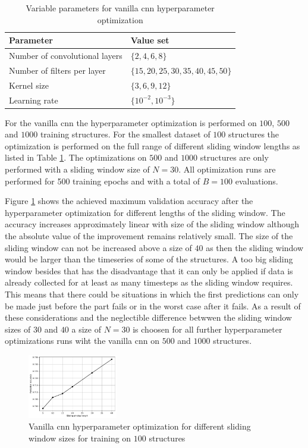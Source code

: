 \documentclass[conference]{IEEEtran}
\begin{document}
\begin{table}[htp]
	\centering
	\caption{Variable parameters for vanilla \gls{cnn} hyperparameter optimization}
	\label{tab:variable_parameters_cnn_optimization}
	\begin{tabular}{ll}
		\textbf{Parameter} & \textbf{Value set} \\
		\hline
		Number of convolutional layers & $ \{2, 4, 6, 8\} $ \\
		Number of filters per layer & $ \{15, 20, 25, 30, 35, 40, 45, 50\} $ \\
		Kernel size & $ \{3, 6, 9, 12\} $ \\
		Learning rate & $ \{10^{-2}, 10^{-3}\} $
	\end{tabular}
\end{table}

For the vanilla \gls{cnn} the hyperparameter optimization is performed on $ 100 $, $ 500 $ and $ 1000 $  training structures. For the smallest dataset of $ 100 $ structures the optimization is performed on the full range of different sliding window lengths as listed in Table \ref{tab:variable_parameters_cnn_optimization}. The optimizations on $ 500 $ and $ 1000 $ structures are only performed with a sliding window size of $ N = 30 $. All optimization runs are performed for 500 training epochs and with a total of $ B = 100 $ evaluations.

Figure \ref{fig:influence_sequence_length_cnn} shows the achieved maximum validation accuracy after the hyperparameter optimization for different lengths of the sliding window. The accuracy increases approximately linear with size of the sliding window although the absolute value of the improvement remains relatively small. The size of the sliding window can not be increased above a size of $ 40 $ as then the sliding window would be larger than the timeseries of some of the structures. A too big sliding window besides that has the disadvantage that it can only be applied if data is already collected for at least as many timesteps as the sliding window requires. This means that there could be situations in which the first predictions can only be made just before the part fails or in the worst case after it fails. As a result of these considerations and the neglectible difference betwwen the sliding window sizes of $ 30 $ and $ 40 $ a size of $ N = 30 $ is choosen for all further hyperparameter optimizations runs wiht the vanilla \gls{cnn} on $ 500 $ and $ 1000 $ structures.

\begin{figure}[htp]
	\centering
	\includegraphics[width=0.35\textwidth]{python/influence_sequence_length_cnn.pdf}
	\caption{Vanilla \gls{cnn} hyperparameter optimization for different sliding window sizes for training on $ 100 $ structures}
	\label{fig:influence_sequence_length_cnn}
\end{figure}
\end{document}
